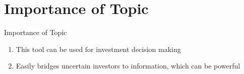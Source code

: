 \documentclass[handout,t]{beamer}
\begin{document}
    \section{Importance of Topic}
        \begin{frame}{Importance of Topic}
        	\begin{doublespacing}
            	\begin{enumerate}
                    \item This tool can be used for investment decision making
                    \item Easily bridges uncertain investors to information, which can be powerful
            	\end{enumerate}
            \end{doublespacing}
        \end{frame}
    
    
\end{document}
